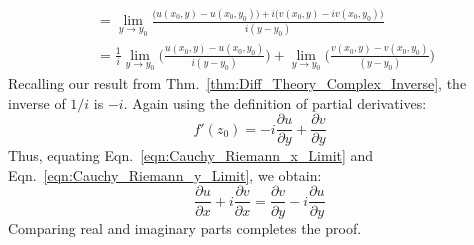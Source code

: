 \documentclass[crop=false,class=book,oneside]{standalone}
\begin{document}
\begin{bproof}
\begin{subequations}
\begin{align}
                        &=\underset{y\rightarrow{y_{0}}}{\lim}
                        \frac{\big(u(x_{0},y)-u(x_{0},y_{0})\big)+
                              i\big(v(x_{0},y)-iv(x_{0},y_{0})\big)}
                             {i(y-y_{0})}\\
                        &=\frac{1}{i}
                        \underset{y\rightarrow{y_{0}}}{\lim}
                        \Big(\frac{u(x_{0},y)-u(x_{0},y_{0})}
                                  {i(y-y_{0})}\Big)+
                        \underset{y\rightarrow{y_{0}}}{\lim}   
                        \Big(\frac{v(x_{0},y)-v(x_{0},y_{0})}
                                  {(y-y_{0})}\Big)
                    \end{align}
                \end{subequations}
                Recalling our result from
                Thm.~\ref{thm:Diff_Theory_Complex_Inverse}, the
                inverse of $1/i$ is $-i$. Again using the
                definition of partial derivatives:
                \begin{equation}
                    \label{eqn:Cauchy_Riemann_y_Limit}
                    f'(z_{0})=
                    -i\frac{\partial{u}}{\partial{y}}+
                    \frac{\partial{v}}{\partial{y}}
                \end{equation}
                Thus, equating
                Eqn.~\ref{eqn:Cauchy_Riemann_x_Limit} and
                Eqn.~\ref{eqn:Cauchy_Riemann_y_Limit}, we obtain:
                \begin{equation}
                    \frac{\partial{u}}{\partial{x}}+
                    i\frac{\partial{v}}{\partial{x}}=
                    \frac{\partial{v}}{\partial{y}}
                    -i\frac{\partial{u}}{\partial{y}}
                \end{equation}
                Comparing real and imaginary parts completes
                the proof.
            \end{bproof}
\end{document}

